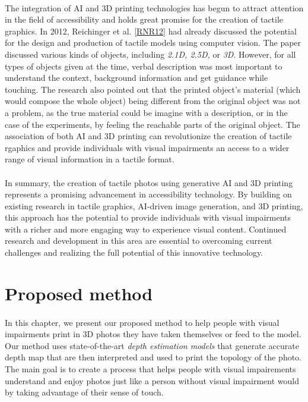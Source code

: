 \documentclass[12pt, letterpaper]{article}
\begin{document}
\begin{spacing}{1.15}
\paragraph{}
The integration of AI and 3D printing technologies has begun to attract attention in the field of accessibility and holds great promise for the creation of tactile graphics.
In 2012, Reichinger et al. \hyperlink{RNR12target}{[RNR12]} had already discussed the potential for the design and production of tactile models using computer vision. The paper discussed
various kinds of objects, including \textit{2.1D, 2.5D,} or \textit{3D}. However, for all types of objects given at the time, verbal description was most important to understand the context,
background information and get guidance while touching. The research also pointed out that the printed object's material (which would compose the whole object) being different from the original
object was not a problem, as the true material could be imagine with a description, or in the case of the experiments, by feeling the reachable parts of the original object.
The association of both AI and 3D printing can revolutionize the creation of tactile rgaphics and provide individuals with visual impairments an access to a wider range of visual
information in a tactile format.

\paragraph{}
In summary, the creation of tactile photos using generative AI and 3D printing represents a promising advancement in accessibility technology. By building on existing research in
tactile graphics, AI-driven image generation, and 3D printing, this approach has the potential to provide individuals with visual impairments with a richer and more engaging way
to experience visual content. Continued research and development in this area are essential to overcoming current challenges and realizing the full potential of this innovative
technology.

\newpage

\section{Proposed method}
\paragraph{}
In this chapter, we present our proposed method to help people with visual impairments print in 3D photos they have taken themselves or feed to the model.
Our method uses state-of-the-art \emph{depth estimation models} that generate accurate depth map that are then interpreted and used to print the 
topology of the photo.
The main goal is to create a process that helps people with visual impairements understand and enjoy photos just like a person without visual impairment
would by taking advantage of their sense of touch.


\end{spacing}
\end{document}

